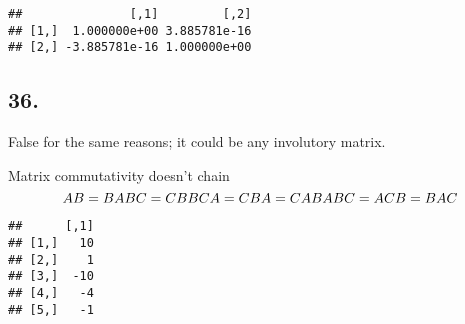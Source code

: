 \documentclass[]{article}
\newenvironment{Shaded}{\begin{snugshade}}{\end{snugshade}}
\newcommand{\DataTypeTok}[1]{\textcolor[rgb]{0.00,0.34,0.68}{#1}}
\newcommand{\DecValTok}[1]{\textcolor[rgb]{0.69,0.50,0.00}{#1}}
\newcommand{\KeywordTok}[1]{\textcolor[rgb]{0.12,0.11,0.11}{\textbf{#1}}}
\newcommand{\NormalTok}[1]{\textcolor[rgb]{0.12,0.11,0.11}{#1}}
\newcommand{\OperatorTok}[1]{\textcolor[rgb]{0.12,0.11,0.11}{#1}}
\newcommand{\OtherTok}[1]{\textcolor[rgb]{0.00,0.43,0.16}{#1}}
\newcommand{\StringTok}[1]{\textcolor[rgb]{0.75,0.01,0.01}{#1}}
\begin{document}
\begin{verbatim}
##               [,1]         [,2]
## [1,]  1.000000e+00 3.885781e-16
## [2,] -3.885781e-16 1.000000e+00
\end{verbatim}

\hypertarget{section-148}{%
\subsection{36.}\label{section-148}}

False for the same reasons; it could be any involutory matrix.

Matrix commutativity doesn't chain \[AB=BA\\
BC=CB\\
BCA=CBA=CAB\\
ABC=ACB=BAC\]

\begin{Shaded}
\end{Shaded}

\begin{verbatim}
##      [,1]
## [1,]   10
## [2,]    1
## [3,]  -10
## [4,]   -4
## [5,]   -1
\end{verbatim}
\end{document}
